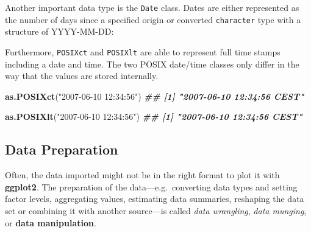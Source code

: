 \documentclass[
]{krantz}
\makeatletter
\newenvironment{Shaded}{\begin{snugshade}}{\end{snugshade}}
\newcommand{\AttributeTok}[1]{\textcolor[rgb]{0.27,0.27,0.27}{#1}}
\newcommand{\DecValTok}[1]{\textcolor[rgb]{0.06,0.06,0.06}{#1}}
\newcommand{\DocumentationTok}[1]{\textcolor[rgb]{0.37,0.37,0.37}{\textbf{\textit{#1}}}}
\newcommand{\FunctionTok}[1]{\textcolor[rgb]{0.27,0.27,0.27}{\textbf{#1}}}
\newcommand{\NormalTok}[1]{#1}
\newcommand{\SpecialCharTok}[1]{\textcolor[rgb]{0.43,0.43,0.43}{\textbf{#1}}}
\newcommand{\StringTok}[1]{\textcolor[rgb]{0.5,0.5,0.5}{#1}}
\newenvironment{kframe}{%
\medskip{}
\setlength{\fboxsep}{.8em}
 \def\at@end@of@kframe{}%
 \ifinner\ifhmode%
  \def\at@end@of@kframe{\end{minipage}}%
  \begin{minipage}{\columnwidth}%
 \fi\fi%
 \def\FrameCommand##1{\hskip\@totalleftmargin \hskip-\fboxsep
 \colorbox{shadecolor}{##1}\hskip-\fboxsep
     \hskip-\linewidth \hskip-\@totalleftmargin \hskip\columnwidth}%
 \MakeFramed {\advance\hsize-\width
   \@totalleftmargin\z@ \linewidth\hsize
   \@setminipage}}%
 {\par\unskip\endMakeFramed%
 \at@end@of@kframe}
\renewenvironment{Shaded}{\begin{kframe}}{\end{kframe}}
\makeatother
\begin{document}
Another important data type is the \texttt{Date} class. Dates are either represented as the number of days since a specified origin or converted \texttt{character} type with a structure of YYYY-MM-DD:

\begin{Shaded}
\end{Shaded}

Furthermore, \texttt{POSIXct} and \texttt{POSIXlt} are able to represent full time stamps including a date and time. The two POSIX date/time classes only differ in the way that the values are stored internally.

\begin{Shaded}
\begin{Highlighting}[]
\FunctionTok{as.POSIXct}\NormalTok{(}\StringTok{"2007{-}06{-}10 12:34:56"}\NormalTok{)}
\DocumentationTok{\#\# [1] "2007{-}06{-}10 12:34:56 CEST"}

\FunctionTok{as.POSIXlt}\NormalTok{(}\StringTok{"2007{-}06{-}10 12:34:56"}\NormalTok{)}
\DocumentationTok{\#\# [1] "2007{-}06{-}10 12:34:56 CEST"}
\end{Highlighting}
\end{Shaded}

\hypertarget{preparation}{%
\subsection{Data Preparation}\label{preparation}}

Often, the data imported might not be in the right format to plot it with \textbf{ggplot2}. The preparation of the data---e.g.~converting data types and setting factor levels, aggregating values, estimating data summaries, reshaping the data set or combining it with another source---is called \emph{data wrangling}, \emph{data munging}, or \textbf{data manipulation}.
\end{document}
